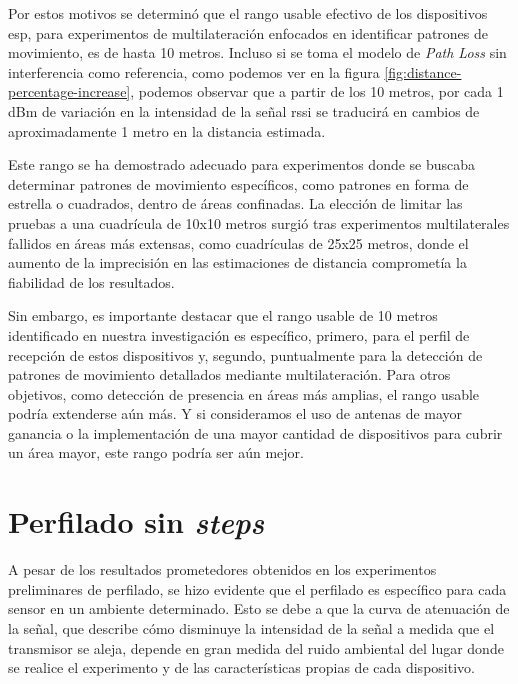 Por estos motivos se determinó que el rango usable efectivo de los dispositivos \acs{esp}, para experimentos de multilateración enfocados en identificar patrones de movimiento, es de hasta 10 metros. Incluso si se toma el modelo de \textit{Path Loss} sin interferencia como referencia, como podemos ver en la figura \ref{fig:distance-percentage-increase}, podemos observar que a partir de los 10 metros, por cada 1 dBm de variación en la intensidad de la señal \acs{rssi} se traducirá en cambios de aproximadamente 1 metro en la distancia estimada.

Este rango se ha demostrado adecuado para experimentos donde se buscaba determinar patrones de movimiento específicos, como patrones en forma de estrella o cuadrados, dentro de áreas confinadas. La elección de limitar las pruebas a una cuadrícula de 10x10 metros surgió tras experimentos multilaterales fallidos en áreas más extensas, como cuadrículas de 25x25 metros, donde el aumento de la imprecisión en las estimaciones de distancia comprometía la fiabilidad de los resultados.

Sin embargo, es importante destacar que el rango usable de 10 metros identificado en nuestra investigación es específico, primero, para el perfil de recepción de estos dispositivos y, segundo, puntualmente para la detección de patrones de movimiento detallados mediante multilateración. Para otros objetivos, como detección de presencia en áreas más amplias, el rango usable podría extenderse aún más. Y si consideramos el uso de antenas de mayor ganancia o la implementación de una mayor cantidad de dispositivos para cubrir un área mayor, este rango podría ser aún mejor.


\section{Perfilado sin \textbf{\textit{steps}}}

A pesar de los resultados prometedores obtenidos en los experimentos preliminares de perfilado, se hizo evidente que el perfilado es específico para cada sensor en un ambiente determinado. Esto se debe a que la curva de atenuación de la señal, que describe cómo disminuye la intensidad de la señal a medida que el transmisor se aleja, depende en gran medida del ruido ambiental del lugar donde se realice el experimento y de las características propias de cada dispositivo.

